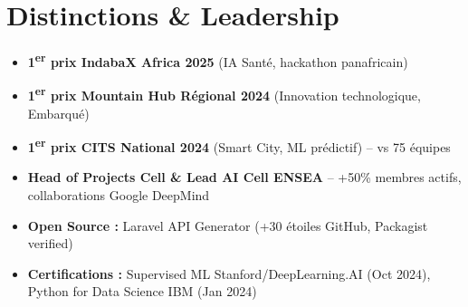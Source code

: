 \documentclass[a4paper,11pt]{article}
\begin{document}
\section{Distinctions \& Leadership}
\begin{itemize}[leftmargin=*, label=\tiny$\bullet$, nosep]
    \item \small{\textbf{1\textsuperscript{er} prix IndabaX Africa 2025} (IA Sant\'e, hackathon panafricain)}
    \item \small{\textbf{1\textsuperscript{er} prix Mountain Hub R\'egional 2024} (Innovation technologique, Embarqu\'e)}
    \item \small{\textbf{1\textsuperscript{er} prix CITS National 2024} (Smart City, ML pr\'edictif) -- vs 75 \'equipes}
    \item \small{\textbf{Head of Projects Cell \& Lead AI Cell ENSEA} -- +50\% membres actifs, collaborations Google DeepMind}
    \item \small{\textbf{Open Source :} Laravel API Generator (+30 \'etoiles GitHub, Packagist verified)}
    \item \small{\textbf{Certifications :} Supervised ML Stanford/DeepLearning.AI (Oct 2024), Python for Data Science IBM (Jan 2024)}
\end{itemize}
\end{document}
